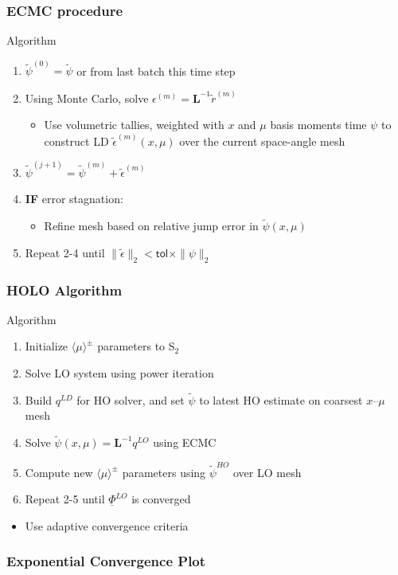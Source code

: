 \documentclass[xcolor=dvipsnames,handout]{beamer}
\newlength{\wideitemsep}
\let\olditem\item
\renewcommand{\item}{\setlength{\itemsep}{\wideitemsep}\olditem}
\newcommand{\B}[1]{\ensuremath{\mathbf{#1}}}
\newcommand{\mom}[1]{\langle #1 \rangle}
\begin{document}
\begin{frame}
    \frametitle{ECMC procedure}
    {
    \begin{block}{Algorithm}
    \begin{enumerate}
        \item $\tilde \psi^{(0)}=\tilde \psi$ or from last batch this time step
        \item Using Monte Carlo, solve $\epsilon^{(m)} = \B L^{-1} \tilde r^{(m)}$
            \begin{itemize}
                \item Use volumetric tallies, weighted with $x$ and $\mu$ basis moments time $\psi$ to construct LD
                    $\tilde\epsilon^{(m)}(x,\mu)$ over the current space-angle mesh
            \end{itemize}
        \item $\tilde \psi^{(j+1)} = \tilde \psi^{(m)} + \tilde \epsilon^{(m)}$
        \item \textbf{IF} error stagnation:
            \begin{itemize}
                \item Refine mesh based on relative jump error in $\tilde \psi(x,\mu)$
            \end{itemize}
        \item Repeat 2-4 until $\| \tilde \epsilon \|_2 < \textsf{tol}\times
            \|\psi\|_2$
    \end{enumerate}
    \end{block}
}
\end{frame}

\begin{frame}
    \frametitle{HOLO Algorithm}
    {
    \begin{block}{Algorithm}
        \begin{enumerate}
            \item Initialize $\mom{\mu}^{\pm}$ parameters to S$_2$
            \item Solve LO system using power iteration
            \item Build $q^{LD}$ for HO solver, and set $\tilde{\psi}$ to latest
                HO estimate
                on coarsest $x$--$\mu$ mesh
            \item Solve $\tilde \psi(x,\mu) = \B L^{-1}q^{LO}$ using ECMC
            \item Compute new $\mom{\mu}^\pm$ parameters using $\tilde \psi^{HO}$ over LO mesh
            \item Repeat 2-5 until $\underline \Phi^{LO}$ is converged
        \end{enumerate}

    \begin{itemize}
        \item Use adaptive convergence criteria
    \end{itemize}
    \end{block}
}
\end{frame}

\begin{frame}
    \frametitle{Exponential Convergence Plot}






\end{frame}
\end{document}
